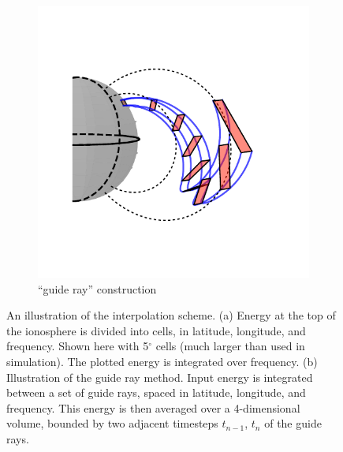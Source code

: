 \begin{figure}
\begin{subfigure}[t]{0.45\textwidth}
        	\includegraphics[trim={1cm 0.25cm 1cm 1cm},clip]{figures/interpolation_globe1.pdf}
	\caption{``guide ray'' construction}
        \label{fig:guide_rays}
    \end{subfigure}
    \caption[Illustrations of the interpolation scheme]{An illustration of the interpolation scheme. (a) Energy at the top of the ionosphere is divided into cells, in latitude, longitude, and frequency. Shown here with 5$^\circ$ cells (much larger than used in simulation). The plotted energy is integrated over frequency. (b) Illustration of the guide ray method. Input energy is integrated between a set of guide rays, spaced in latitude, longitude, and frequency. This energy is then averaged over a 4-dimensional volume, bounded by two adjacent timesteps $t_{n-1}$, $t_n$ of the guide rays.}
    \label{fig:interpolation_scheme}
\end{figure}


